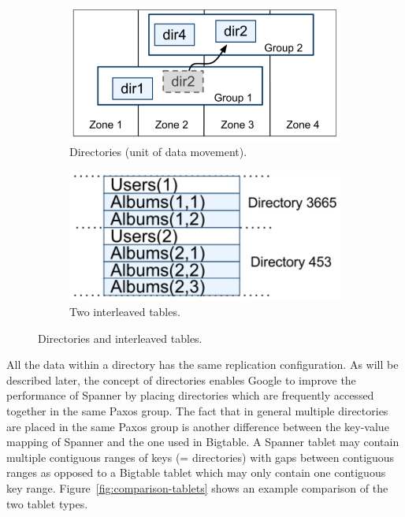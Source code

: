 \documentclass[onecolumn, a4paper, 10pt]{article}
\begin{document}
\begin{figure}[ht]
  \centering
  \begin{subfigure}{0.45\textwidth}
    \includegraphics[width = \textwidth]{figs/directories}
    \caption{Directories (unit of data movement).~\cite{Corbett:2012}}
    \label{subfig:directories}
  \end{subfigure}
  \qquad
  \begin{subfigure}{0.45\textwidth}
    \includegraphics[width = \textwidth]{figs/interleaving-example.png}
    \caption{Two interleaved tables.~\cite{Corbett:2012}}
    \label{subfig:interleaved-tables}
  \end{subfigure}
  \caption{Directories and interleaved tables.}
  \label{fig:directories-and-tables}
\end{figure}

All the data within a directory has the same replication configuration. As will
be described later, the concept of directories enables Google to improve the
performance of Spanner by placing directories which are frequently accessed
together in the same Paxos group. The fact that in general multiple directories
are placed in the same Paxos group is another difference between the key-value
mapping of Spanner and the one used in Bigtable. A Spanner tablet may contain
multiple contiguous ranges of keys (= directories) with gaps between contiguous
ranges as opposed to a Bigtable tablet which may only contain one contiguous key
range. Figure~\ref{fig:comparison-tablets} shows an example comparison of the two
tablet types.
\end{document}
